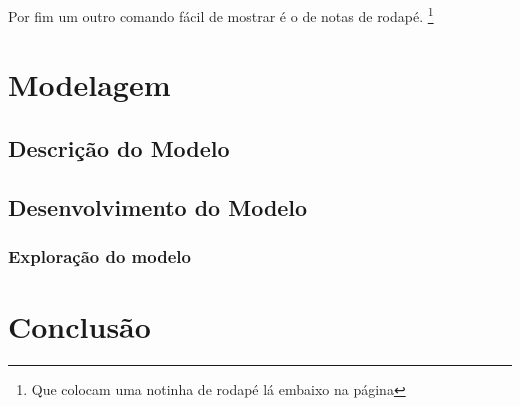 Por fim um outro comando fácil de mostrar é o de notas de rodapé. \footnote{Que colocam uma notinha de rodapé lá embaixo na página}


\chapter{Modelagem} \label{modelagem}

\lipsum[5]
\section{Descrição do Modelo} \label{descrição}

\lipsum[5]

\section{Desenvolvimento do Modelo} \label{desenv}

\lipsum[10]

\subsection{Exploração do modelo}

\lipsum[10]

\chapter{Conclusão} \label{conclusao}

\lipsum[10]